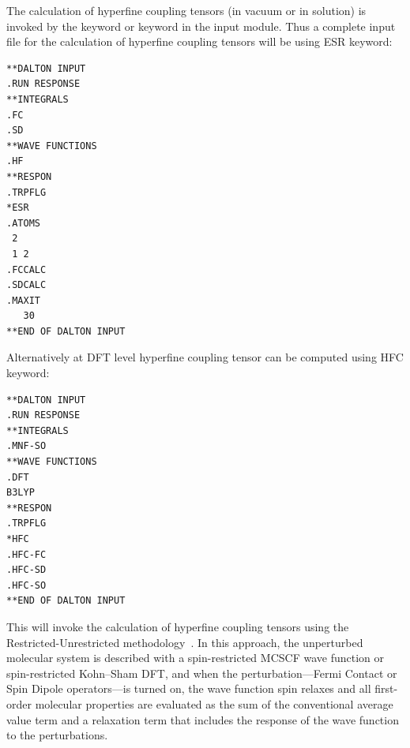\begin{center}
\end{center}

    The calculation of hyperfine coupling tensors (in vacuum or in
solution) is invoked by the keyword  or keyword  in the 
input module. Thus a complete input file for the calculation of
hyperfine coupling tensors will be using ESR keyword:

\begin{verbatim}
**DALTON INPUT
.RUN RESPONSE
**INTEGRALS
.FC
.SD
**WAVE FUNCTIONS
.HF
**RESPON
.TRPFLG
*ESR
.ATOMS
 2
 1 2
.FCCALC
.SDCALC
.MAXIT
   30
**END OF DALTON INPUT
\end{verbatim}

    Alternatively at DFT level hyperfine coupling tensor can be computed using HFC keyword:

 \begin{verbatim}
**DALTON INPUT
.RUN RESPONSE
**INTEGRALS
.MNF-SO
**WAVE FUNCTIONS
.DFT
B3LYP
**RESPON
.TRPFLG
*HFC
.HFC-FC
.HFC-SD 
.HFC-SO
**END OF DALTON INPUT
\end{verbatim}
    
    This will invoke the calculation of hyperfine
coupling tensors
using the Restricted-Unrestricted
methodology~\cite{bfpjjbjothhjajjcp97}. In this approach, the
unperturbed molecular system is described with a spin-restricted MCSCF
wave function or spin-restricted Kohn--Sham DFT, and when the perturbation---Fermi Contact or Spin Dipole
operators---is turned on, the wave function spin relaxes and all
first-order molecular properties are evaluated as the sum of the
conventional average value term and a relaxation term that includes
the response of the wave function to the perturbations.

